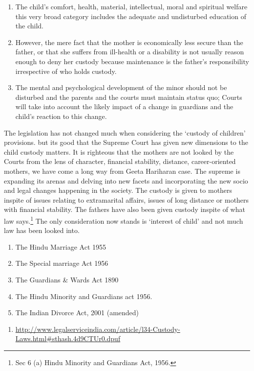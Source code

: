 \begin{multicols}{2}
\begin{enumerate}
\item The child's comfort, health, material, intellectual, moral and spiritual welfare this very
broad category includes the adequate and undisturbed education of the child.

\item However, the mere fact that the mother is economically less secure than the father, or that
she suffers from ill-health or a disability is not usually reason enough to deny her custody
because maintenance is the father's responsibility irrespective of who holds custody.

\item The mental and psychological development of the minor should not be disturbed and the
parents and the courts must maintain status quo; Courts will take into account the likely
impact of a change in guardians and the child's reaction to this change.
\end{enumerate}


\noi
The legislation has not changed much when considering the ‘custody of children’ provisions. but
its good that the Supreme Court has given new dimensions to the child custody matters. It is
righteous that the mothers are not looked by the Courts from the lens of character, financial
stability, distance, career-oriented mothers, we have come a long way from Geeta Hariharan case.
The supreme is expanding its arenas and delving into new facets and incorporating the new socio
and legal changes happening in the society. The custody is given to mothers inspite of issues
relating to extramarital affairs, issues of long distance or mothers with financial stability. The
fathers have also been given custody inspite of what law says.\footnote{Sec 6 (a) Hindu Minority and Guardians Act, 1956.} The only consideration now stands is ‘interest of child’ and not much law has been looked into.


\begin{enumerate}
\item The Hindu Marriage Act 1955

\item The Special marriage Act 1956

\item The Guardians \& Wards Act 1890

\item The Hindu Minority and Guardians act 1956.

\item The Indian Divorce Act, 2001 (amended) 
\end{enumerate}


\begin{enumerate}
\item \url{http://www.legalserviceindia.com/article/l34-Custody-Laws.html\#sthash.4d9CTUr0.dpuf}
\end{enumerate}
\end{multicols}
